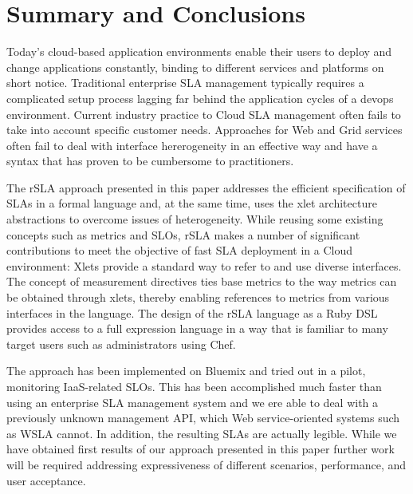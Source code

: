 \section{Summary and Conclusions}

Today's cloud-based application environments enable their users to deploy and change applications constantly, binding to different services and platforms on short notice. Traditional enterprise SLA management typically requires a complicated setup process lagging far behind the application cycles of a devops environment. Current industry practice to Cloud SLA management often fails to take into account specific customer needs. Approaches for Web and Grid services often fail to deal with interface hererogeneity in an effective way and have a syntax that has proven to be cumbersome to practitioners.

The rSLA approach presented in this paper addresses the efficient specification of SLAs in a formal language and, at the same time, uses the xlet architecture abstractions to overcome issues of heterogeneity.  While reusing some existing concepts such as metrics and SLOs, rSLA makes a number of significant contributions to meet the objective of fast SLA deployment in a Cloud environment: Xlets provide a standard way to refer to and use diverse interfaces. The concept of measurement directives ties base metrics to the way metrics can be obtained through xlets, thereby enabling references to metrics from various interfaces in the language. The design of the rSLA language as a Ruby DSL provides access to a full expression language in a way that is familiar to many target users such as administrators using Chef. 

The approach has been implemented on Bluemix and tried out in a pilot, monitoring IaaS-related SLOs. This has been accomplished much faster than using an enterprise SLA management system and we ere able to deal with a previously unknown management API, which Web service-oriented systems such as WSLA cannot. In addition, the resulting SLAs are actually legible. While we have obtained first results of our approach presented in this paper further work will be required addressing expressiveness of different scenarios, performance, and user acceptance.





